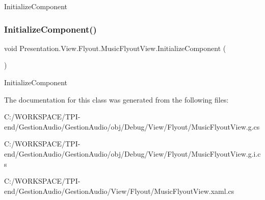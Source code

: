 Initialize\+Component 

\mbox{\label{class_presentation_1_1_view_1_1_flyout_1_1_music_flyout_view_ae8007344b032def03546b7eed13aebef}} 
\subsubsection{\texorpdfstring{Initialize\+Component()}{InitializeComponent()}\hspace{0.1cm}{\footnotesize\ttfamily [4/4]}}
{\footnotesize\ttfamily void Presentation.\+View.\+Flyout.\+Music\+Flyout\+View.\+Initialize\+Component (\begin{DoxyParamCaption}{ }\end{DoxyParamCaption})}



Initialize\+Component 



The documentation for this class was generated from the following files\+:\begin{DoxyCompactItemize}
\item 
C\+:/\+W\+O\+R\+K\+S\+P\+A\+C\+E/\+T\+P\+I-\/end/\+Gestion\+Audio/\+Gestion\+Audio/obj/\+Debug/\+View/\+Flyout/Music\+Flyout\+View.\+g.\+cs\item 
C\+:/\+W\+O\+R\+K\+S\+P\+A\+C\+E/\+T\+P\+I-\/end/\+Gestion\+Audio/\+Gestion\+Audio/obj/\+Debug/\+View/\+Flyout/Music\+Flyout\+View.\+g.\+i.\+cs\item 
C\+:/\+W\+O\+R\+K\+S\+P\+A\+C\+E/\+T\+P\+I-\/end/\+Gestion\+Audio/\+Gestion\+Audio/\+View/\+Flyout/Music\+Flyout\+View.\+xaml.\+cs\end{DoxyCompactItemize}
